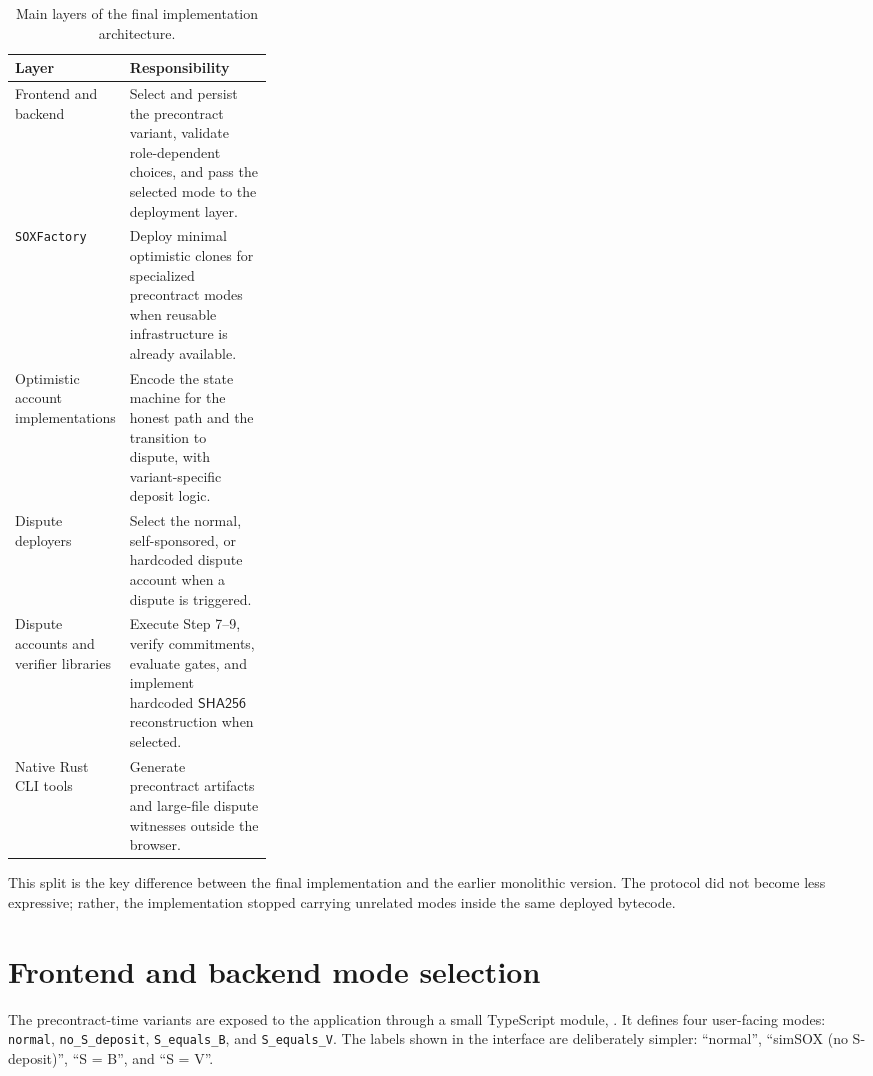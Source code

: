 \begin{table}[htbp]
  \centering
  \begin{tabularx}{\linewidth}{>{\raggedright\arraybackslash}p{0.30\linewidth}>{\raggedright\arraybackslash}X}
    \toprule
    Layer & Responsibility \\
    \midrule
    Frontend and backend &
    Select and persist the precontract variant, validate role-dependent choices, and pass
    the selected mode to the deployment layer. \\
    \texttt{SOXFactory} &
    Deploy minimal optimistic clones for specialized precontract modes when reusable
    infrastructure is already available. \\
    Optimistic account implementations &
    Encode the state machine for the honest path and the transition to dispute, with
    variant-specific deposit logic. \\
    Dispute deployers &
    Select the normal, self-sponsored, or hardcoded dispute account when a dispute is
    triggered. \\
    Dispute accounts and verifier libraries &
    Execute Step 7--9, verify commitments, evaluate gates, and implement hardcoded
    \(\mathsf{SHA256}\) reconstruction when selected. \\
    Native Rust CLI tools &
    Generate precontract artifacts and large-file dispute witnesses outside the browser. \\
    \bottomrule
  \end{tabularx}
  \caption{Main layers of the final implementation architecture.}
  \label{tab:architecture-layers}
\end{table}

This split is the key difference between the final implementation and the earlier
monolithic version. The protocol did not become less expressive; rather, the implementation
stopped carrying unrelated modes inside the same deployed bytecode.

\section{Frontend and backend mode selection}

The precontract-time variants are exposed to the application through a small TypeScript
module, . It defines four user-facing modes:
\texttt{normal}, \texttt{no\_S\_deposit}, \texttt{S\_equals\_B}, and
\texttt{S\_equals\_V}. The labels shown in the interface are deliberately simpler:
``normal'', ``simSOX (no S-deposit)'', ``S = B'', and ``S = V''.

